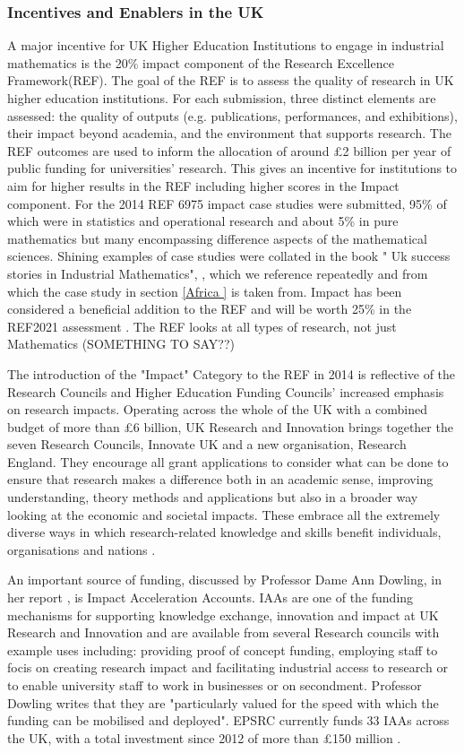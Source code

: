 \documentclass[11pt]{article} %
\begin{document}
\subsubsection{Incentives and Enablers in the UK} 
A major incentive for UK Higher Education Institutions to engage in industrial mathematics is the 20\% impact component of the Research Excellence Framework(REF). The goal of the REF is to assess the quality of research in UK higher education institutions. For each submission, three distinct elements are assessed: the quality of outputs (e.g. publications, performances, and exhibitions), their impact beyond academia, and the environment that supports research. The REF outcomes are used to inform the allocation of around £2 billion per year of public funding for universities’ research.  This gives an incentive for institutions to aim for higher results in the REF including higher scores in the Impact component. For the 2014 REF 6975 impact case studies were submitted, 95\% of which were in statistics and operational research and about 5\% in pure mathematics but many encompassing difference aspects of the mathematical sciences. Shining examples of case studies were collated in the book " Uk success stories in Industrial Mathematics", \cite{Aston2016},  which we reference repeatedly and from which the case study in section \ref{Africa } is taken from. Impact has been considered a beneficial addition to the REF and will be worth 25\% in the REF2021 assessment \cite{REF2017}. The REF looks at all types of research, not just Mathematics (SOMETHING TO SAY??)

The introduction of the "Impact" Category to the REF in 2014 is reflective of the Research Councils and Higher Education Funding Councils' increased emphasis on research impacts. Operating across the whole of the UK with a combined budget of more than £6 billion, UK Research and Innovation brings together the seven Research Councils, Innovate UK and a new organisation, Research England. They encourage all grant applications to consider  what can be done to ensure that research makes a difference both in an academic sense, improving understanding, theory methods and applications but also in a broader way looking at the economic and societal impacts. These embrace all the extremely diverse ways in which research-related knowledge and skills benefit individuals, organisations and nations \cite{UKRI}. 

An important source of funding, discussed by Professor Dame Ann Dowling, in her report \cite{DOWLING2015}, is Impact Acceleration Accounts. IAAs are one of the funding mechanisms for supporting knowledge exchange, innovation and impact at UK Research and Innovation and are available from several Research councils with example uses including: providing proof of concept funding, employing staff to focis on creating research impact and facilitating industrial access to research or to enable university staff to work in businesses or on secondment. Professor Dowling writes that they are "particularly valued for the speed with which the funding can be mobilised and deployed".  EPSRC currently funds 33 IAAs across the UK, with a total investment since 2012 of more than £150 million \cite{IAA}.
		
\end{document}
